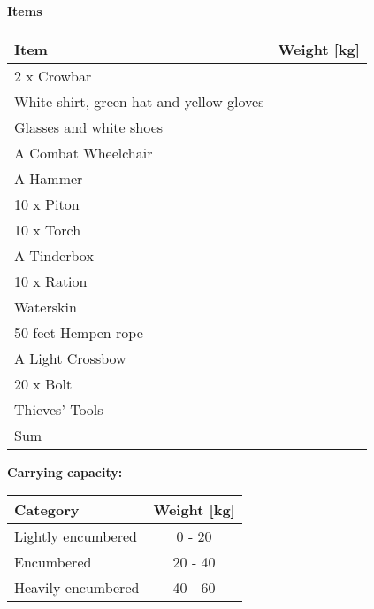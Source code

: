 \documentclass[11pt]{article}
\begin{document}
\clearpage

	\begin{center}
{\LARGE \textbf{Items}}
	\end{center}

	\begin{tabularx}{\textwidth}{X|r}
Item & Weight [kg] \\
\hline
2 x Crowbar									& 		 	\\
White shirt, green hat and yellow gloves	&			\\
Glasses and white shoes						&			\\
A Combat Wheelchair						 	& 			\\
A Hammer									& 			\\
10 x Piton								 	&			\\
10 x Torch									&			\\
A Tinderbox								 	& 			\\
10 x Ration									&	 	 	\\
Waterskin								 	& 			\\
50 feet Hempen rope						 	& 			\\
A Light Crossbow							&			\\
20 x Bolt									&	 	 	\\
Thieves' Tools								&	 	 	\\
\hline
Sum 										& 
	\end{tabularx}

\vspace{10mm}

\textbf{Carrying capacity:} \\

	\begin{tabular}{l|c}
Category & Weight [kg] \\
\hline
Lightly encumbered 	& 0 - 20 	\\
Encumbered 			& 20 - 40 	\\
Heavily encumbered	& 40 - 60
	\end{tabular}
\end{document}
